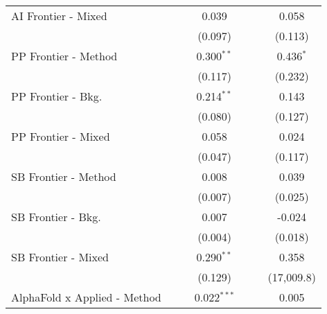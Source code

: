 \begin{tabular}{lcccccc}
   AI Frontier - Mixed            &                &                & 0.039          &                &                & 0.058\\   
                                  &                &                & (0.097)        &                &                & (0.113)\\   
   PP Frontier - Method           &                &                & 0.300$^{**}$   &                &                & 0.436$^{*}$\\   
                                  &                &                & (0.117)        &                &                & (0.232)\\   
   PP Frontier - Bkg.             &                &                & 0.214$^{**}$   &                &                & 0.143\\   
                                  &                &                & (0.080)        &                &                & (0.127)\\   
   PP Frontier - Mixed            &                &                & 0.058          &                &                & 0.024\\   
                                  &                &                & (0.047)        &                &                & (0.117)\\   
   SB Frontier - Method           &                &                & 0.008          &                &                & 0.039\\   
                                  &                &                & (0.007)        &                &                & (0.025)\\   
   SB Frontier - Bkg.             &                &                & 0.007          &                &                & -0.024\\   
                                  &                &                & (0.004)        &                &                & (0.018)\\   
   SB Frontier - Mixed            &                &                & 0.290$^{**}$   &                &                & 0.358\\   
                                  &                &                & (0.129)        &                &                & (17,009.8)\\   
   AlphaFold x Applied - Method   &                &                & 0.022$^{***}$  &                &                & 0.005\\   

\end{tabular}
